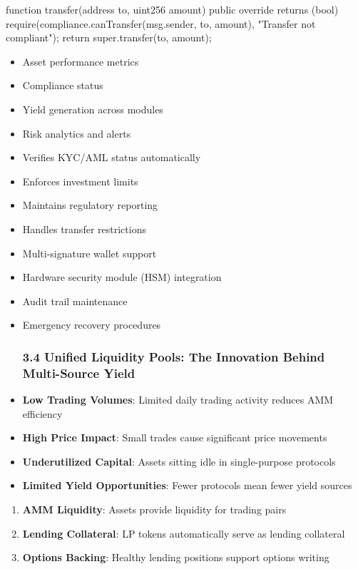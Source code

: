 \documentclass[12pt]{article}
\begin{document}
{{{    function transfer(address to, uint256 amount)         public         override         returns (bool)     {        require(compliance.canTransfer(msg.sender, to, amount), "Transfer not compliant");        return super.transfer(to, amount);    }}
\begin{itemize}
	\item Asset performance metrics
	\item Compliance status
	\item Yield generation across modules
	\item Risk analytics and alerts
	\item Verifies KYC/AML status automatically
	\item Enforces investment limits
	\item Maintains regulatory reporting
	\item Handles transfer restrictions
	\item Multi-signature wallet support
	\item Hardware security module (HSM) integration
	\item Audit trail maintenance
	\item Emergency recovery procedures
\subsubsection{3.4 Unified Liquidity Pools: The Innovation Behind Multi-Source Yield} %
	\item \textbf{Low Trading Volumes}: Limited daily trading activity reduces AMM efficiency
	\item \textbf{High Price Impact}: Small trades cause significant price movements
	\item \textbf{Underutilized Capital}: Assets sitting idle in single-purpose protocols
	\item \textbf{Limited Yield Opportunities}: Fewer protocols mean fewer yield sources

\end{itemize}
\begin{enumerate}
	\item \textbf{AMM Liquidity}: Assets provide liquidity for trading pairs
	\item \textbf{Lending Collateral}: LP tokens automatically serve as lending collateral
	\item \textbf{Options Backing}: Healthy lending positions support options writing


\end{enumerate}}}
\end{document}
